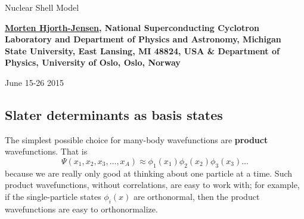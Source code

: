 \documentclass[%
twoside,                 %
final,                   %
10pt]{article}
\begin{document}






\thispagestyle{empty}

\begin{center}
{\LARGE\bf
\begin{spacing}{1.25}
Nuclear Shell Model
\end{spacing}
}
\end{center}


\begin{center}
{\bf \href{{http://computationalphysics.no}}{Morten Hjorth-Jensen}, National Superconducting Cyclotron Laboratory and Department of Physics and Astronomy, Michigan State University, East Lansing, MI 48824, USA {\&} Department of Physics, University of Oslo, Oslo, Norway${}^{}$} \\ [0mm]
\end{center}

    \begin{center}
\end{center}
    

\begin{center} %
June 15-26 2015
\end{center}

\vspace{1cm}


\tableofcontents


\vspace{1cm} %




\subsection{Slater determinants as basis states}

The simplest possible choice for many-body wavefunctions are \textbf{product} wavefunctions.
That is
\[ 
\Psi(x_1, x_2, x_3, \ldots, x_A) \approx \phi_1(x_1) \phi_2(x_2) \phi_3(x_3) \ldots
\]
because we are really only good  at thinking about one particle at a time. Such 
product wavefunctions, without correlations, are easy to 
work with; for example, if the single-particle states $\phi_i(x)$ are orthonormal, then 
the product wavefunctions are easy to orthonormalize.   
\end{document}
